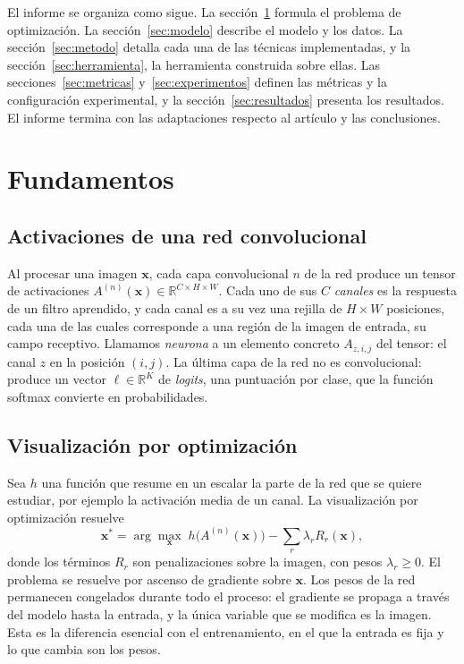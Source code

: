 \documentclass[11pt,a4paper]{article}
\newcommand{\vx}{\mathbf{x}}
\begin{document}
El informe se organiza como sigue. La sección~\ref{sec:fundamentos}
formula el problema de optimización. La sección~\ref{sec:modelo} describe el
modelo y los datos. La sección~\ref{sec:metodo} detalla cada una de las
técnicas implementadas, y la sección~\ref{sec:herramienta}, la herramienta
construida sobre ellas. Las secciones~\ref{sec:metricas}
y~\ref{sec:experimentos} definen las métricas y la configuración
experimental, y la sección~\ref{sec:resultados} presenta los resultados.
El informe termina con las adaptaciones respecto al artículo y las
conclusiones.

\section{Fundamentos}
\label{sec:fundamentos}

\subsection{Activaciones de una red convolucional}

Al procesar una imagen $\vx$, cada capa convolucional $n$ de la red produce
un tensor de activaciones $A^{(n)}(\vx) \in \mathbb{R}^{C \times H \times W}$.
Cada uno de sus $C$ \emph{canales} es la respuesta de un filtro aprendido, y
cada canal es a su vez una rejilla de $H \times W$ posiciones, cada una de
las cuales corresponde a una región de la imagen de entrada, su campo
receptivo. Llamamos \emph{neurona} a un elemento concreto $A_{z,i,j}$ del
tensor: el canal $z$ en la posición $(i,j)$. La última capa de la red no es
convolucional: produce un vector $\boldsymbol{\ell} \in \mathbb{R}^{K}$ de
\emph{logits}, una puntuación por clase, que la función softmax convierte en
probabilidades.

\subsection{Visualización por optimización}

Sea $h$ una función que resume en un escalar la parte de la red que se
quiere estudiar, por ejemplo la activación media de un canal. La
visualización por optimización resuelve
\begin{equation}
\vx^{*} = \arg\max_{\vx} \; h\bigl(A^{(n)}(\vx)\bigr) - \sum_{r} \lambda_r R_r(\vx),
\label{eq:problema}
\end{equation}
donde los términos $R_r$ son penalizaciones sobre la imagen, con pesos
$\lambda_r \geq 0$. El problema se resuelve por ascenso de gradiente sobre
$\vx$. Los pesos de la red permanecen congelados durante todo el proceso: el
gradiente se propaga a través del modelo hasta la entrada, y la única
variable que se modifica es la imagen. Esta es la diferencia esencial con el
entrenamiento, en el que la entrada es fija y lo que cambia son los pesos.
\end{document}
